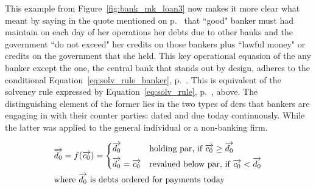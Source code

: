 This example from Figure~\ref{fig:bank_mk_loan3} now makes it more clear what \citeauthor{innes1913} meant by saying in the quote mentioned on p.~\pageref{innes_on_good_banker} that ``good" banker must had maintain on each day of her operations her debts due to other banks and the government ``do not exceed" her credits on those bankers plus ``lawful money" or credits on the government that she held. This key operational equasion of the any banker except the one, the central bank that stands out by design, adheres to the conditional Equation~\ref{eq:solv_rule_banker}, p.~\pageref{eq:solv_rule_banker}. This is equivalent of the solvency rule expressed by Equation~\ref{eq:solv_rule}, p.~\pageref{eq:solv_rule}, above. The distinguishing element of the former lies in the two types of \acfp{dcr} that bankers are engaging in with their counter parties: dated and due today continuously. While the latter was applied to the general individual or a non-banking firm. 

\begin{equation}\label{eq:solv_rule_banker}
\begin{split}
     & \overrightarrow{d_{0}}=f(\overrightarrow{c_{0}})= 
\begin{dcases}
    \overrightarrow{d_0} & \text{holding par, if } \overrightarrow{c_0} \geq \overrightarrow{d_0} \\
    \overrightarrow{d_0}=\overrightarrow{c_0} & \text{revalued below par, if } \overrightarrow{c_0} < \overrightarrow{d_0} \\
\end{dcases} \\
& \text{where } \overrightarrow{d_0} \text{ is debts ordered for payments today}
\end{split}
\end{equation}

